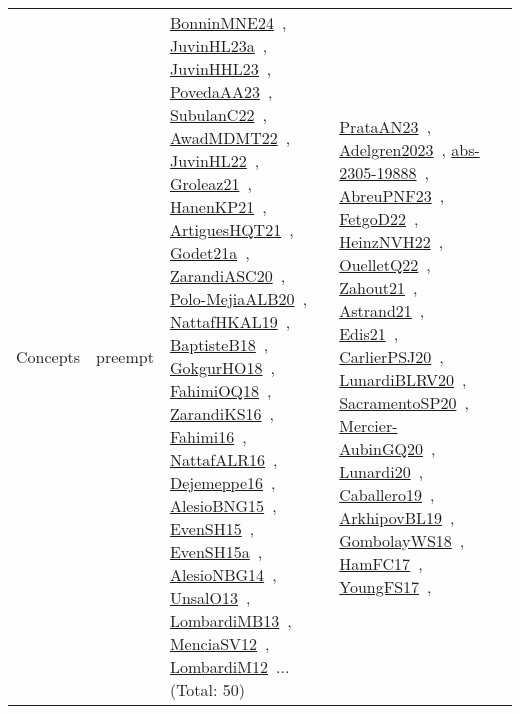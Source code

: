 {\begin{longtable}{lp{3cm}>{\raggedright\arraybackslash}p{6cm}>{\raggedright\arraybackslash}p{6cm}>{\raggedright\arraybackslash}p{8cm}}
\index{preempt}\index{Concepts!preempt}Concepts & preempt & \href{../works/BonninMNE24.pdf}{BonninMNE24}~\cite{BonninMNE24}, \href{../works/JuvinHL23a.pdf}{JuvinHL23a}~\cite{JuvinHL23a}, \href{../works/JuvinHHL23.pdf}{JuvinHHL23}~\cite{JuvinHHL23}, \href{../works/PovedaAA23.pdf}{PovedaAA23}~\cite{PovedaAA23}, \href{../works/SubulanC22.pdf}{SubulanC22}~\cite{SubulanC22}, \href{../works/AwadMDMT22.pdf}{AwadMDMT22}~\cite{AwadMDMT22}, \href{../works/JuvinHL22.pdf}{JuvinHL22}~\cite{JuvinHL22}, \href{../works/Groleaz21.pdf}{Groleaz21}~\cite{Groleaz21}, \href{../works/HanenKP21.pdf}{HanenKP21}~\cite{HanenKP21}, \href{../works/ArtiguesHQT21.pdf}{ArtiguesHQT21}~\cite{ArtiguesHQT21}, \href{../works/Godet21a.pdf}{Godet21a}~\cite{Godet21a}, \href{../works/ZarandiASC20.pdf}{ZarandiASC20}~\cite{ZarandiASC20}, \href{../works/Polo-MejiaALB20.pdf}{Polo-MejiaALB20}~\cite{Polo-MejiaALB20}, \href{../works/NattafHKAL19.pdf}{NattafHKAL19}~\cite{NattafHKAL19}, \href{../works/BaptisteB18.pdf}{BaptisteB18}~\cite{BaptisteB18}, \href{../works/GokgurHO18.pdf}{GokgurHO18}~\cite{GokgurHO18}, \href{../works/FahimiOQ18.pdf}{FahimiOQ18}~\cite{FahimiOQ18}, \href{../works/ZarandiKS16.pdf}{ZarandiKS16}~\cite{ZarandiKS16}, \href{../works/Fahimi16.pdf}{Fahimi16}~\cite{Fahimi16}, \href{../works/NattafALR16.pdf}{NattafALR16}~\cite{NattafALR16}, \href{../works/Dejemeppe16.pdf}{Dejemeppe16}~\cite{Dejemeppe16}, \href{../works/AlesioBNG15.pdf}{AlesioBNG15}~\cite{AlesioBNG15}, \href{../works/EvenSH15.pdf}{EvenSH15}~\cite{EvenSH15}, \href{../works/EvenSH15a.pdf}{EvenSH15a}~\cite{EvenSH15a}, \href{../works/AlesioNBG14.pdf}{AlesioNBG14}~\cite{AlesioNBG14}, \href{../works/UnsalO13.pdf}{UnsalO13}~\cite{UnsalO13}, \href{../works/LombardiMB13.pdf}{LombardiMB13}~\cite{LombardiMB13}, \href{../works/MenciaSV12.pdf}{MenciaSV12}~\cite{MenciaSV12}, \href{../works/LombardiM12.pdf}{LombardiM12}~\cite{LombardiM12}... (Total: 50) & \href{../works/PrataAN23.pdf}{PrataAN23}~\cite{PrataAN23}, \href{../works/Adelgren2023.pdf}{Adelgren2023}~\cite{Adelgren2023}, \href{../works/abs-2305-19888.pdf}{abs-2305-19888}~\cite{abs-2305-19888}, \href{../works/AbreuPNF23.pdf}{AbreuPNF23}~\cite{AbreuPNF23}, \href{../works/FetgoD22.pdf}{FetgoD22}~\cite{FetgoD22}, \href{../works/HeinzNVH22.pdf}{HeinzNVH22}~\cite{HeinzNVH22}, \href{../works/OuelletQ22.pdf}{OuelletQ22}~\cite{OuelletQ22}, \href{../works/Zahout21.pdf}{Zahout21}~\cite{Zahout21}, \href{../works/Astrand21.pdf}{Astrand21}~\cite{Astrand21}, \href{../works/Edis21.pdf}{Edis21}~\cite{Edis21}, \href{../works/CarlierPSJ20.pdf}{CarlierPSJ20}~\cite{CarlierPSJ20}, \href{../works/LunardiBLRV20.pdf}{LunardiBLRV20}~\cite{LunardiBLRV20}, \href{../works/SacramentoSP20.pdf}{SacramentoSP20}~\cite{SacramentoSP20}, \href{../works/Mercier-AubinGQ20.pdf}{Mercier-AubinGQ20}~\cite{Mercier-AubinGQ20}, \href{../works/Lunardi20.pdf}{Lunardi20}~\cite{Lunardi20}, \href{../works/Caballero19.pdf}{Caballero19}~\cite{Caballero19}, \href{../works/ArkhipovBL19.pdf}{ArkhipovBL19}~\cite{ArkhipovBL19}, \href{../works/GombolayWS18.pdf}{GombolayWS18}~\cite{GombolayWS18}, \href{../works/HamFC17.pdf}{HamFC17}~\cite{HamFC17}, \href{../works/YoungFS17.pdf}{YoungFS17}~\cite{YoungFS17}, 
\end{longtable}}
